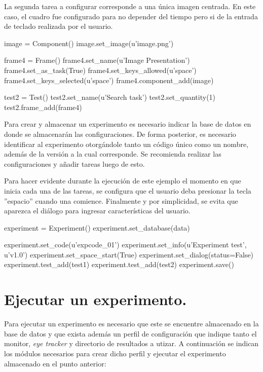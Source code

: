 \documentclass[\main/main.tex]{subfiles}
\begin{document}
        La segunda tarea a configurar corresponde a una única imagen centrada. En este caso, el cuadro fue configurado para no depender del tiempo pero si de la entrada de teclado realizada por el usuario.  

\begin{singlespace}\begin{python}
image = Component()
image.set_image(u'image.png')

frame4 = Frame()
frame4.set_name(u'Image Presentation')
frame4.set_as_task(True)
frame4.set_keys_allowed(u'space')
frame4.set_keys_selected(u'space')
frame4.component_add(image)

test2 = Test()
test2.set_name(u'Search task')
test2.set_quantity(1)
test2.frame_add(frame4)
\end{python}\end{singlespace}

        Para crear y almacenar un experimento es necesario indicar la base de datos en donde se almacenarán las configuraciones. De forma posterior, es necesario identificar al experimento otorgándole tanto un código único como un nombre, además de la versión a la cual corresponde. Se recomienda realizar las configuraciones y añadir tareas luego de esto.

        Para hacer evidente durante la ejecución de este ejemplo el momento en que inicia cada una de las tareas, se configura que el usuario deba presionar la tecla ''espacio'' cuando una comience. Finalmente y por simplicidad, se evita que aparezca el diálogo para ingresar características del usuario. 

\begin{singlespace}\begin{python}
experiment = Experiment()
experiment.set_database(data)

experiment.set_code(u'expcode_01')
experiment.set_info(u'Experiment test', u'v1.0')
experiment.set_space_start(True)
experiment.set_dialog(status=False)
experiment.test_add(test1)
experiment.test_add(test2)
experiment.save()
\end{python}\end{singlespace}

    \section{Ejecutar un experimento.}
    \label{sec:04_ejecutar}
        Para ejecutar un experimento es necesario que este se encuentre almacenado en la base de datos y que exista además un perfil de configuración que indique tanto el monitor, \textit{eye tracker} y directorio de resultados a utizar. A continuación se indican los módulos necesarios para crear dicho perfil y ejecutar el experimento almacenado en el punto anterior: 
\end{document}
